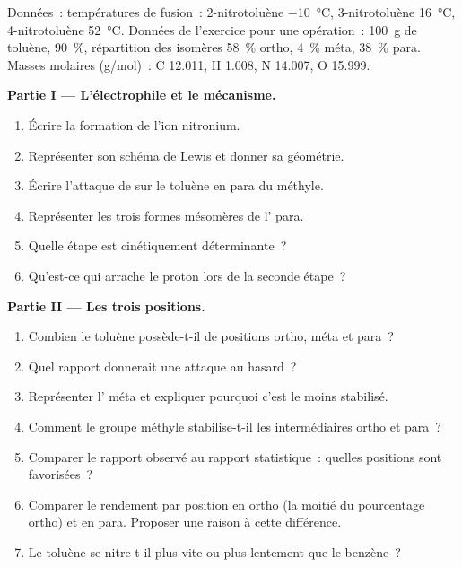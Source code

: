 \begin{problem}
\label{pb:b2:aromatic-substitution:1}
Données~: températures de fusion~: 2-nitrotoluène \qty{-10}{\degreeCelsius}, 3-nitrotoluène
\qty{16}{\degreeCelsius}, 4-nitrotoluène \qty{52}{\degreeCelsius}. Données de l'exercice pour une opération~:
\qty{100}{g} de toluène,  90~\%, répartition des isomères 58~\% ortho, 4~\% méta,
38~\% para. Masses molaires (\unit{g/mol})~: C 12.011, H 1.008, N 14.007, O 15.999.

\medskip
\noindent\textbf{Partie I --- L'électrophile et le mécanisme.}
\begin{enumerate}
  \item Écrire la formation de l'ion nitronium.
  \item Représenter son schéma de Lewis et donner sa géométrie.
  \item Écrire l'attaque de  sur le toluène en para du méthyle.
  \item Représenter les trois formes mésomères de l' para.
  \item Quelle étape est cinétiquement déterminante~?
  \item Qu'est-ce qui arrache le proton lors de la seconde étape~?
\end{enumerate}

\medskip
\noindent\textbf{Partie II --- Les trois positions.}
\begin{enumerate}[resume]
  \item Combien le toluène possède-t-il de positions ortho, méta et para~?
  \item Quel rapport donnerait une attaque au hasard~?
  \item Représenter l' méta et expliquer pourquoi c'est le moins stabilisé.
  \item Comment le groupe méthyle stabilise-t-il les intermédiaires ortho et para~?
  \item Comparer le rapport observé au rapport statistique~: quelles positions sont favorisées~?
  \item Comparer le rendement par position en ortho (la moitié du pourcentage ortho) et en para.
        Proposer une raison à cette différence.
  \item Le toluène se nitre-t-il plus vite ou plus lentement que le benzène~?
\end{enumerate}


\end{problem}
